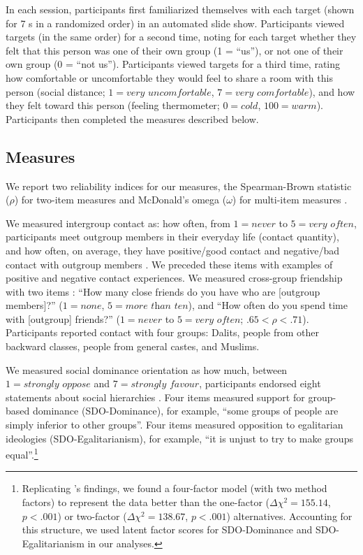 \documentclass[12pt, a4paper]{article}
\begin{document}
In each session, participants first familiarized themselves with each target (shown for 7 s in a randomized order) in an automated slide show. Participants viewed targets (in the same order) for a second time, noting for each target whether they felt that this person was one of their own group (1 = ``us''), or not one of their own group (0 = ``not us''). Participants viewed targets for a third time, rating how comfortable or uncomfortable they would feel to share a room with this person (social distance; $1 = \textit{very uncomfortable}$, $7 = \textit{very comfortable}$), and how they felt toward this person (feeling thermometer; $0 = \textit{cold}$, $100 = \textit{warm}$). Participants then completed the measures described below.

\subsection{Measures}

We report two reliability indices for our measures, the Spearman-Brown statistic ($\rho$) for two-item measures \cite{eisinga_reliability_2013} and McDonald's omega ($\omega$) for multi-item measures \cite{dunn_alpha_2014}. 

We measured intergroup contact as: how often, from $1 = \textit{never}$ to $5 = \textit{very often}$, participants meet outgroup members in their everyday life (contact quantity), and how often, on average, they have positive/good contact and negative/bad contact with outgroup members \cite{barlow_contact_2012}. We preceded these items with examples of positive and negative contact experiences. We measured cross-group friendship with two items \cite{turner_reducing_2007}: ``How many close friends do you have who are [outgroup members]?'' ($1 = \textit{none}$, $5 = \textit{more than ten}$), and ``How often do you spend time with [outgroup] friends?'' ($1 = \textit{never}$ to $5 = \textit{very often}$; $.65 < \rho < .71$). Participants reported contact with four groups: Dalits, people from other backward classes, people from general castes, and Muslims.

We measured social dominance orientation as how much, between $1 = \textit{strongly oppose}$ and $7 = \textit{strongly favour}$, participants endorsed eight statements about social hierarchies \cite{ho_nature_2015}. Four items measured support for group-based dominance (SDO-Dominance), for example, ``some groups of people are simply inferior to other groups''. Four items measured opposition to egalitarian ideologies (SDO-Egalitarianism), for example, ``it is unjust to try to make groups equal''.\footnote{Replicating \citeauthor{ho_nature_2015}’s \citeyear{ho_nature_2015} findings, we found a four-factor model (with two method factors) to represent the data better than the one-factor ($\Delta\chi^2 = 155.14$, $p < .001$) or two-factor ($\Delta\chi^2 = 138.67$, $p < .001$) alternatives. Accounting for this structure, we used latent factor scores for SDO-Dominance and SDO-Egalitarianism in our analyses.}
\end{document}
